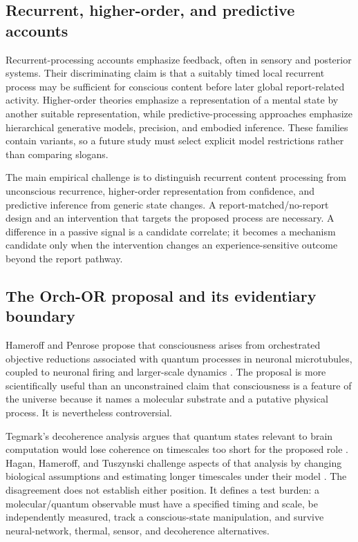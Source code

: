 \documentclass[conference]{IEEEtran}
\begin{document}
\subsection{Recurrent, higher-order, and predictive accounts}

Recurrent-processing accounts emphasize feedback, often in sensory and posterior systems. Their discriminating claim is that a suitably timed local recurrent process may be sufficient for conscious content before later global report-related activity. Higher-order theories emphasize a representation of a mental state by another suitable representation, while predictive-processing approaches emphasize hierarchical generative models, precision, and embodied inference. These families contain variants, so a future study must select explicit model restrictions rather than comparing slogans.

The main empirical challenge is to distinguish recurrent content processing from unconscious recurrence, higher-order representation from confidence, and predictive inference from generic state changes. A report-matched/no-report design and an intervention that targets the proposed process are necessary. A difference in a passive signal is a candidate correlate; it becomes a mechanism candidate only when the intervention changes an experience-sensitive outcome beyond the report pathway.

\subsection{The Orch-OR proposal and its evidentiary boundary}

Hameroff and Penrose propose that consciousness arises from orchestrated objective reductions associated with quantum processes in neuronal microtubules, coupled to neuronal firing and larger-scale dynamics \cite{hameroff2014}. The proposal is more scientifically useful than an unconstrained claim that consciousness is a feature of the universe because it names a molecular substrate and a putative physical process. It is nevertheless controversial.

Tegmark's decoherence analysis argues that quantum states relevant to brain computation would lose coherence on timescales too short for the proposed role \cite{tegmark2000}. Hagan, Hameroff, and Tuszynski challenge aspects of that analysis by changing biological assumptions and estimating longer timescales under their model \cite{hagan2002}. The disagreement does not establish either position. It defines a test burden: a molecular/quantum observable must have a specified timing and scale, be independently measured, track a conscious-state manipulation, and survive neural-network, thermal, sensor, and decoherence alternatives.
\end{document}
